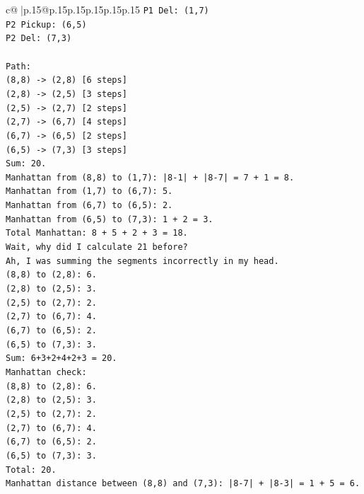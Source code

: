 \documentclass{article}
\begin{document}
{\begin{supertabular}{c@{$\;$}|p{.15\linewidth}@{}p{.15\linewidth}p{.15\linewidth}p{.15\linewidth}p{.15\linewidth}p{.15\linewidth}}
{{{\texttt{P1 Del: (1,7)} \\
\texttt{P2 Pickup: (6,5)} \\
\texttt{P2 Del: (7,3)} \\
\\ 
\texttt{Path:} \\
\texttt{(8,8) {-}> (2,8) {[}6 steps{]}} \\
\texttt{(2,8) {-}> (2,5) {[}3 steps{]}} \\
\texttt{(2,5) {-}> (2,7) {[}2 steps{]}} \\
\texttt{(2,7) {-}> (6,7) {[}4 steps{]}} \\
\texttt{(6,7) {-}> (6,5) {[}2 steps{]}} \\
\texttt{(6,5) {-}> (7,3) {[}3 steps{]}} \\
\texttt{Sum: 20.} \\
\texttt{Manhattan from (8,8) to (1,7): |8{-}1| + |8{-}7| = 7 + 1 = 8.} \\
\texttt{Manhattan from (1,7) to (6,7): 5.} \\
\texttt{Manhattan from (6,7) to (6,5): 2.} \\
\texttt{Manhattan from (6,5) to (7,3): 1 + 2 = 3.} \\
\texttt{Total Manhattan: 8 + 5 + 2 + 3 = 18.} \\
\texttt{Wait, why did I calculate 21 before?} \\
\texttt{Ah, I was summing the segments incorrectly in my head.} \\
\texttt{(8,8) to (2,8): 6.} \\
\texttt{(2,8) to (2,5): 3.} \\
\texttt{(2,5) to (2,7): 2.} \\
\texttt{(2,7) to (6,7): 4.} \\
\texttt{(6,7) to (6,5): 2.} \\
\texttt{(6,5) to (7,3): 3.} \\
\texttt{Sum: 6+3+2+4+2+3 = 20.} \\
\texttt{Manhattan check:} \\
\texttt{(8,8) to (2,8): 6.} \\
\texttt{(2,8) to (2,5): 3.} \\
\texttt{(2,5) to (2,7): 2.} \\
\texttt{(2,7) to (6,7): 4.} \\
\texttt{(6,7) to (6,5): 2.} \\
\texttt{(6,5) to (7,3): 3.} \\
\texttt{Total: 20.} \\
\texttt{Manhattan distance between (8,8) and (7,3): |8{-}7| + |8{-}3| = 1 + 5 = 6.} \\
}}}
\end{supertabular}}
\end{document}
